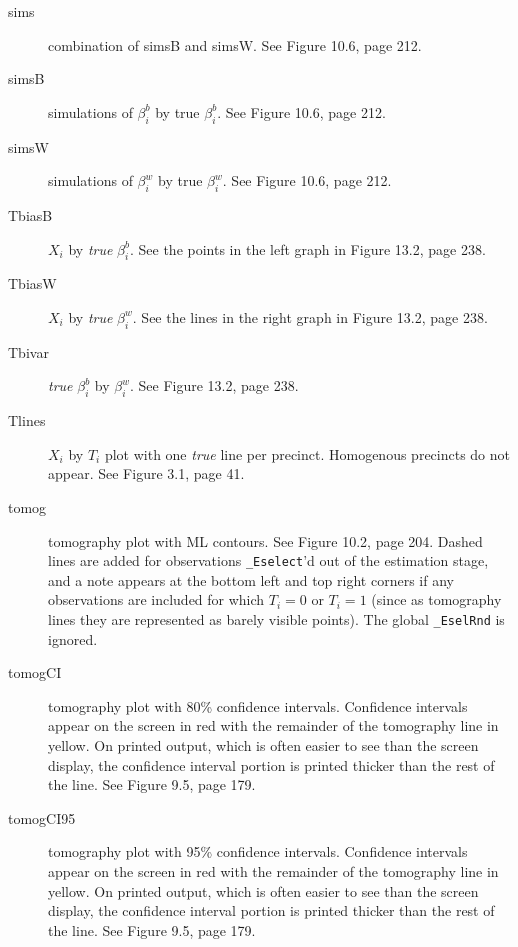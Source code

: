 \documentclass[11pt,titlepage]{article}
\begin{document}
\begin{description}
\item[sims] combination of simsB and simsW.  See Figure 10.6, page
  212.

\item[simsB] simulations of $\beta_i^b$ by true $\beta_i^b$.  See
  Figure 10.6, page 212.

\item[simsW] simulations of $\beta_i^w$ by true $\beta_i^w$.  See
  Figure  10.6, page 212.

\item[TbiasB] $X_i$ by \emph{true} $\beta_i^b$.  See the points in the left
  graph in Figure 13.2, page 238.

\item[TbiasW] $X_i$ by \emph{true} $\beta_i^w$.  See the lines in the right
  graph in Figure  13.2, page 238.

\item[Tbivar] \emph{true} $\beta_i^b$ by $\beta_i^w$.  See Figure
  13.2, page 238.

\item[Tlines] $X_i$ by $T_i$ plot with one \emph{true} line per
  precinct.  Homogenous precincts do not appear.  See Figure 3.1, page
  41.

\item[tomog] tomography plot with ML contours. See Figure 10.2, page
  204.  Dashed lines are added for observations \texttt{\_Eselect}'d
  out of the estimation stage, and a note appears at the bottom left
  and top right corners if any observations are included for which
  $T_i=0$ or $T_i=1$ (since as tomography lines they are represented
  as barely visible points).  The global \texttt{\_EselRnd} is
  ignored.

\item[tomogCI] tomography plot with 80\% confidence intervals.
  Confidence intervals appear on the screen in red with the remainder
  of the tomography line in yellow.  On printed output, which is often
  easier to see than the screen display, the confidence interval
  portion is printed thicker than the rest of the line.  See Figure
  9.5, page 179.

\item[tomogCI95] tomography plot with 95\% confidence intervals.
  Confidence intervals appear on the screen in red with the remainder
  of the tomography line in yellow.  On printed output, which is often
  easier to see than the screen display, the confidence interval
  portion is printed thicker than the rest of the line.  See Figure
  9.5, page 179.


\end{description}
\end{document}
